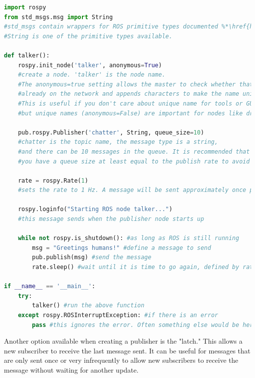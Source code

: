 \documentclass[twoside]{article}
\begin{document}
\begin{lstlisting}[language=python]
import rospy
from std_msgs.msg import String
#std_msgs contain wrappers for ROS primitive types documented %*\href{http://wiki.ros.org/std_msgs}{here}%*.
#String is one of the primitive types available.

def talker():
    rospy.init_node('talker', anonymous=True)
    #create a node. 'talker' is the node name.
    #The anonymous=true setting allows the master to check whether that name exists
    #already on the network and appends characters to make the name unique.
    #This is useful if you don't care about unique name for tools or GUIs,
    #but unique names (anonymous=False) are important for nodes like drivers.

    pub.rospy.Publisher('chatter', String, queue_size=10)
    #chatter is the topic name, the message type is a string,
    #and there can be 10 messages in the queue. It is recommended that
    #you have a queue size at least equal to the publish rate to avoid missed messages.

    rate = rospy.Rate(1)
    #sets the rate to 1 Hz. A message will be sent approximately once per second

    rospy.loginfo("Starting ROS node talker...")
    #this message sends when the publisher node starts up

    while not rospy.is_shutdown(): #as long as ROS is still running
        msg = "Greetings humans!" #define a message to send
        pub.publish(msg) #send the message
        rate.sleep() #wait until it is time to go again, defined by rate

if __name__ == '__main__':
    try:
        talker() #run the above function
    except rospy.ROSInterruptException: #if there is an error
        pass #this ignores the error. Often something else would be here

\end{lstlisting}

Another option available when creating a publisher is the "latch." This allows a new subscriber to receive the last message sent. It can be useful for messages that are only sent once or very infrequently to allow new subscribers to receive the message without waiting for another update.
\end{document}
